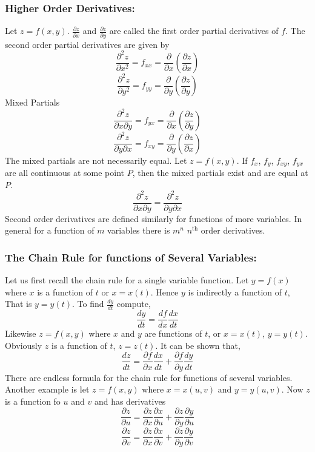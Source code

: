 \documentclass[14pt]{article}
\begin{document}
    \subsubsection{Higher Order Derivatives:}
    Let $z=f(x,y)$. $\frac{\partial z}{\partial x}$ and $\frac{\partial
    z}{\partial y}$ are called the first order partial derivatives of
    $f$. The second order partial derivatives are given by
    $$\frac{\partial^2z}{\partial x^2}=f_{xx}=\frac{\partial}{\partial
    x}\left(\frac{\partial z}{\partial x}\right)$$ 
    $$\frac{\partial^2z}{\partial y^2}=f_{yy}=\frac{\partial}{\partial
    y}\left(\frac{\partial z}{\partial y}\right)$$ Mixed Partials
    $$\frac{\partial^2 z}{\partial x\partial
    y}=f_{yx}=\frac{\partial}{\partial x}\left(\frac{\partial
    z}{\partial y}\right)$$
    $$\frac{\partial^2 z}{\partial y\partial
    x}=f_{xy}=\frac{\partial}{\partial y}\left(\frac{\partial
    z}{\partial x}\right)$$ The mixed partials are not necessarily
    equal. Let $z=f(x,y)$. If $f_x$, $f_y$, $f_{xy}$, $f_{yx}$ are all
    continuous at some point $P$, then the mixed partials exist and are
    equal at $P$.
    $$\frac{\partial^2 z}{\partial x\partial y}=\frac{\partial^2
    z}{\partial y\partial x}$$ Second order derivatives are defined
    similarly for functions of more variables. In general for a function
    of $m$ variables there is $m^n$ $n^{\mathrm{th}}$ order derivatives.
    \subsubsection{The Chain Rule for functions of Several Variables:}
    Let us first recall the chain rule for a single variable function.
    Let $y=f(x)$ where $x$ is a function of $t$ or $x=x(t)$. Hence $y$
    is indirectly a function of $t$, That is $y=y(t)$. To find
    $\frac{dy}{dt}$ compute,
    $$\frac{dy}{dt}=\frac{df}{dx}\frac{dx}{dt}$$ Likewise $z=f(x,y)$
    where $x$ and $y$ are functions of $t$, or $x=x(t)$, $y=y(t)$.
    Obviously $z$ is a function of $t$, $z=z(t)$. It can be shown that,
    $$\frac{dz}{dt}=\frac{\partial f}{\partial
    x}\frac{dx}{dt}+\frac{\partial f}{\partial y}\frac{dy}{dt}$$ There
    are endless formula for the chain rule for functions of several
    variables. Another example is let $z=f(x,y)$ where $x=x(u,v)$ and
    $y=y(u,v)$. Now $z$ is a function fo $u$ and $v$ and has derivatives
    $$\frac{\partial z}{\partial u}=\frac{\partial z}{\partial
    x}\frac{\partial x}{\partial u}+\frac{\partial z}{\partial
    y}\frac{\partial y}{\partial u}$$
    $$\frac{\partial z}{\partial v}=\frac{\partial z}{\partial
    x}\frac{\partial x}{\partial v}+\frac{\partial z}{\partial
    y}\frac{\partial y}{\partial v}$$
\end{document}
